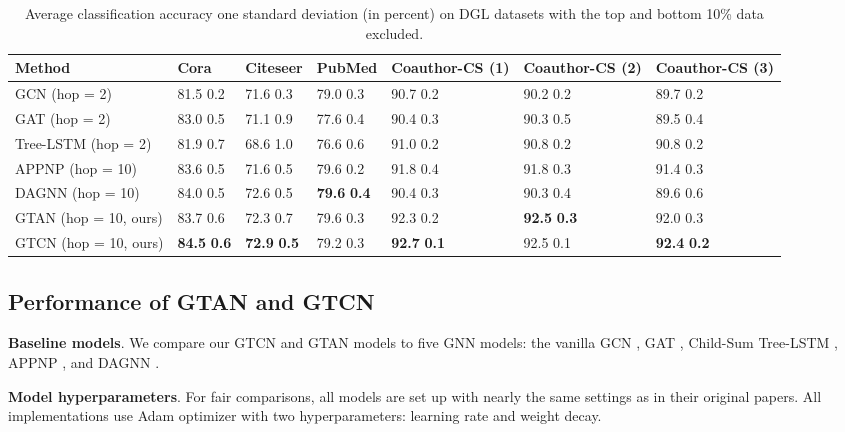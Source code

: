 \documentclass[lettersize,journal]{IEEEtran}
\theoremstyle{plain}
\theoremstyle{definition}
\theoremstyle{remark}
\begin{document}
\begin{table*}[t]
	\caption{Average classification accuracy  one standard deviation (in percent) on DGL datasets with the top and bottom 10\% data excluded.}
	\label{tb:result1}
	\begin{center}
		\begin{tabularx}{0.9\textwidth}{p{3.5cm} p{1.5cm} p{1.5cm} p{1.5cm} p{1.5cm} p{1.5cm} p{1.5cm}}
			\toprule
			\textbf{Method}  &\textbf{Cora} &\textbf{Citeseer}
			&\textbf{PubMed} &\textbf{Coauthor-CS (1)}
			&\textbf{Coauthor-CS (2)}
			&\textbf{Coauthor-CS (3)} \\
			\midrule
			GCN (hop = 2)  &81.5  0.2 &71.6  0.3 &79.0  0.3 &90.7  0.2 &90.2  0.2 &89.7  0.2\\
			GAT (hop = 2) &83.0  0.5 &71.1  0.9 &77.6  0.4 &90.4  0.3 &90.3  0.5 &89.5  0.4\\
			Tree-LSTM (hop = 2) &81.9  0.7 &68.6  1.0 &76.6  0.6 &91.0  0.2 &90.8  0.2 &90.8  0.2\\
			APPNP (hop = 10) &83.6  0.5 &71.6  0.5 &79.6  0.2 &91.8  0.4 &91.8  0.3 &91.4  0.3\\
			DAGNN (hop = 10) &84.0  0.5 &72.6  0.5 &\textbf{79.6}  \textbf{0.4} &90.4  0.3 &90.3  0.4 &89.6  0.6\\
\midrule
			GTAN (hop = 10, ours) &83.7  0.6 &72.3  0.7 &79.6  0.3 &92.3  0.2 &\textbf{92.5}  \textbf{0.3} &92.0  0.3\\
			GTCN (hop = 10, ours) &\textbf{84.5}  \textbf{0.6} &\textbf{72.9}  \textbf{0.5} &79.2  0.3 &\textbf{92.7}  \textbf{0.1} &92.5  0.1 &\textbf{92.4}  \textbf{0.2}\\
			\bottomrule
		\end{tabularx}
	\end{center}
\end{table*}

\subsection{Performance of GTAN and GTCN}
\label{exp_GTC_GTAN}

\textbf{Baseline models}. We compare our GTCN and GTAN models to five GNN models: the vanilla GCN \citep{DBLP:conf/iclr/KipfW17}, GAT \citep{DBLP:conf/iclr/VelickovicCCRLB18}, Child-Sum Tree-LSTM \citep{tai2015improved}, APPNP \citep{klicpera2018predict}, and DAGNN \citep{liu2020towards}.

\textbf{Model hyperparameters}. For fair comparisons, all models are set up with nearly the same settings as in their original papers. All implementations use Adam optimizer with two hyperparameters: learning rate and weight decay.
\end{document}
